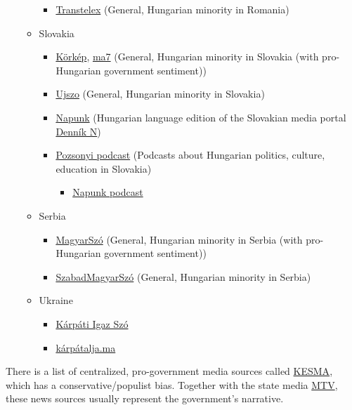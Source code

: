 \documentclass{article}
\begin{document}
\begin{itemize}
\begin{itemize}
\begin{itemize}
            \item \href{https://transtelex.ro/}{Transtelex} (General, Hungarian minority in Romania)
        \end{itemize}
        \item Slovakia
        \begin{itemize}
            \item \href{https://korkep.sk/}{Körkép}, \href{https://ma7.sk/}{ma7} (General, Hungarian minority in Slovakia (with pro-Hungarian government sentiment))
            \item \href{https://ujszo.com/}{Ujszo} (General, Hungarian minority in Slovakia)
            \item \href{https://napunk.dennikn.sk/}{Napunk} (Hungarian language edition of the Slovakian media portal \href{https://dennikn.sk/}{Denník N})
            \item \href{https://pozsonyi.podbean.com/}{Pozsonyi podcast} (Podcasts about Hungarian politics, culture, education in Slovakia)
            \begin{itemize}
                \item \href{https://open.spotify.com/show/0m24bsFtUxEISfknxvCHqT}{Napunk podcast}
            \end{itemize}
        \end{itemize}
        \item Serbia
        \begin{itemize}
            \item \href{https://www.magyarszo.rs/}{MagyarSzó} (General, Hungarian minority in Serbia (with pro-Hungarian government sentiment))
            \item \href{https://szmsz.press/}{SzabadMagyarSzó} (General, Hungarian minority in Serbia)
        \end{itemize}
        \item Ukraine
        \begin{itemize}
            \item \href{https://kiszo.net/}{Kárpáti Igaz Szó}
            \item \href{https://karpatalja.ma/}{kárpátalja.ma}
        \end{itemize}
        
    \end{itemize}
\end{itemize}


There is a list of centralized, pro-government media sources called \href{https://en.wikipedia.org/wiki/Central_European_Press_and_Media_Foundation}{KESMA}, which has a conservative/populist bias. Together with the state media \href{http://mtva.hu/}{MTV}, these news sources usually represent the government's narrative.
\end{document}
